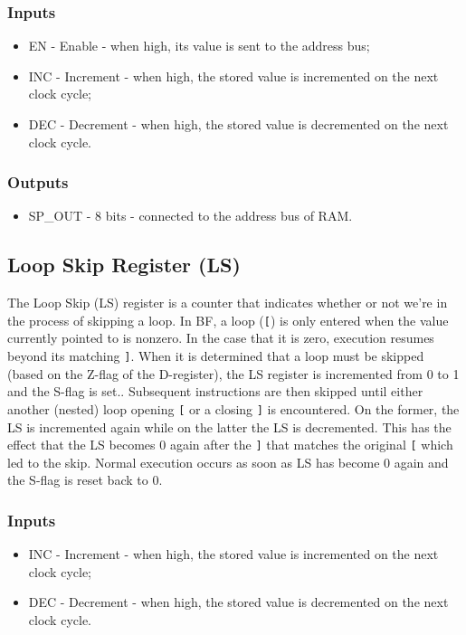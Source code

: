 \subsubsection*{Inputs}
\begin{itemize}
\itemsep0em 
\item EN - Enable - when high, its value is sent to the address bus;
\item INC - Increment - when high, the stored value is incremented on the next clock cycle;
\item DEC - Decrement - when high, the stored value is decremented on the next clock cycle.
\end{itemize}

\subsubsection*{Outputs}
\begin{itemize}
\itemsep0em 
\item SP\_OUT - 8 bits - connected to the address bus of RAM.
\end{itemize}

\subsection{Loop Skip Register (LS)} \label{sec:architecture:ls}
The Loop Skip (LS) register is a counter that indicates whether or not we're in the process of skipping a loop. In BF, a loop (\texttt{[}) is only entered when the value currently pointed to is nonzero. In the case that it is zero, execution resumes beyond its matching \texttt{]}. When it is determined that a loop must be skipped (based on the Z-flag of the D-register), the LS register is incremented from 0 to 1 and the S-flag is set.. Subsequent instructions are then skipped until either another (nested) loop opening \texttt{[} or a closing \texttt{]} is encountered. On the former, the LS is incremented again while on the latter the LS is decremented. This has the effect that the LS becomes 0 again after the \texttt{]} that matches the original \texttt{[} which led to the skip. Normal execution occurs as soon as LS has become 0 again and the S-flag is reset back to 0.

\subsubsection*{Inputs}
\begin{itemize}
\itemsep0em 
\item INC - Increment - when high, the stored value is incremented on the next clock cycle;
\item DEC - Decrement - when high, the stored value is decremented on the next clock cycle.
\end{itemize}

